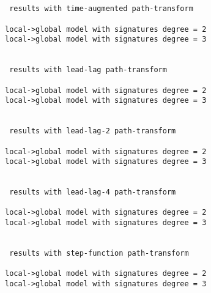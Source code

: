 \documentclass[11pt]{article}
\begin{document}
    \begin{Verbatim}[commandchars=\\\{\}]

 
 results with time-augmented path-transform 

local->global model with signatures degree = 2
local->global model with signatures degree = 3

 
 results with lead-lag path-transform 

local->global model with signatures degree = 2
local->global model with signatures degree = 3

 
 results with lead-lag-2 path-transform 

local->global model with signatures degree = 2
local->global model with signatures degree = 3

 
 results with lead-lag-4 path-transform 

local->global model with signatures degree = 2
local->global model with signatures degree = 3

 
 results with step-function path-transform 

local->global model with signatures degree = 2
local->global model with signatures degree = 3

    \end{Verbatim}

    \begin{center}
    \end{center}
    { \hspace*{\fill} \\}
    
\end{document}
